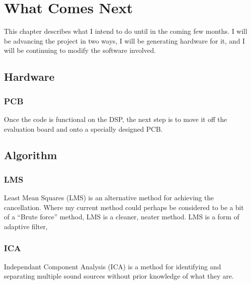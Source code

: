 \chapter{What Comes Next}

This chapter describes what I intend to do until in the coming few months.
I will be advancing the project in two ways, I will be generating hardware for it, and I will be continuing to modify the software involved.

\section{Hardware}
\subsection{PCB}
Once the code is functional on the DSP, the next step is to move it off the evaluation board and onto a specially designed PCB.

\section{Algorithm}
\subsection{LMS}
Least Mean Squares (LMS) is an alternative method for achieving the cancellation.
Where my current method could perhaps be considered to be a bit of a ``Brute force'' method, LMS is a cleaner, neater method.
LMS is a form of adaptive filter,

\subsection{ICA}
Independant Component Analysis (ICA) is a method for identifying and separating multiple sound sources without prior knowledge of what they are.
